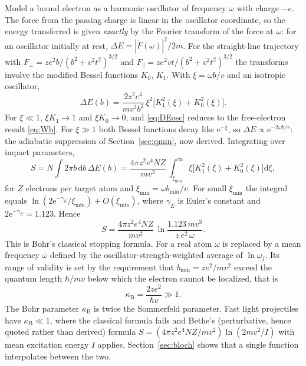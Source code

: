 \documentclass[11pt,a4paper]{book}
\numberwithin{equation}{chapter}
\newcommand{\dd}{\mathrm{d}}
\newcommand{\ee}{\mathrm{e}}
\newcommand{\kB}{\kappa_{\mathrm B}}
\begin{document}
Model a bound electron as a harmonic oscillator of frequency $\omega$ with
charge $-e$. The force from the passing charge is linear in the oscillator
coordinate, so the energy transferred is given \emph{exactly} by the Fourier
transform of the force at $\omega$: for an oscillator initially at rest,
$\Delta E=|\tilde F(\omega)|^2/2m$. For the straight-line trajectory with
$F_\perp=ze^2b/(b^2+v^2t^2)^{3/2}$ and
$F_\parallel=ze^2vt/(b^2+v^2t^2)^{3/2}$ the transforms involve the modified Bessel
functions $K_0$, $K_1$. With $\xi=\omega b/v$ and an isotropic oscillator,
\begin{equation}\label{eq:DEosc}
  \Delta E(b)=\frac{2z^2e^4}{mv^2b^2}\,\xi^2\bigl[K_1^2(\xi)+K_0^2(\xi)\bigr].
\end{equation}
For $\xi\ll1$, $\xi K_1\to1$ and $\xi K_0\to0$, and \eqref{eq:DEosc} reduces to
the free-electron result \eqref{eq:Wb}. For $\xi\gg1$ both Bessel functions decay
like $\ee^{-\xi}$, so $\Delta E\propto\ee^{-2\omega b/v}$: the adiabatic
suppression of Section~\ref{sec:qmin}, now derived. Integrating over impact
parameters,
\begin{equation}\label{eq:Bohr-int}
  S=N\!\int2\pi b\,\dd b\,\Delta E(b)=\frac{4\pi z^2e^4NZ}{mv^2}\,
    \int_{\xi_{\min}}^{\infty}\xi\bigl[K_1^2(\xi)+K_0^2(\xi)\bigr]\dd\xi ,
\end{equation}
for $Z$ electrons per target atom and $\xi_{\min}=\omega b_{\min}/v$. For small
$\xi_{\min}$ the integral equals $\ln(2\ee^{-\gamma_E}/\xi_{\min})+O(\xi_{\min})$,
where $\gamma_E$ is Euler's constant and $2\ee^{-\gamma_E}=1.123$. Hence
\begin{equation}\label{eq:Bohr}
  S=\frac{4\pi z^2e^4NZ}{mv^2}\,\ln\frac{1.123\,mv^3}{z\,e^2\,\omega}.
\end{equation}
This is Bohr's classical stopping formula. For a real atom $\omega$ is replaced
by a mean frequency $\bar\omega$ defined by the oscillator-strength-weighted
average of $\ln\omega_j$. Its range of validity is set by the requirement that
$b_{\min}=ze^2/mv^2$ exceed the quantum length $\hbar/mv$ below which the
electron cannot be localized, that is
\begin{equation}\label{eq:kappaB}
  \kB=\frac{2ze^2}{\hbar v}\gg1 .
\end{equation}
The Bohr parameter $\kB$ is twice the Sommerfeld parameter. Fast light
projectiles have $\kB\ll1$, where the classical formula fails and Bethe's
(perturbative, hence quoted rather than derived) formula
$S=(4\pi z^2e^4NZ/mv^2)\ln(2mv^2/I)$ with mean excitation energy $I$ applies.
Section~\ref{sec:bloch} shows that a single function interpolates between the
two.
\end{document}

